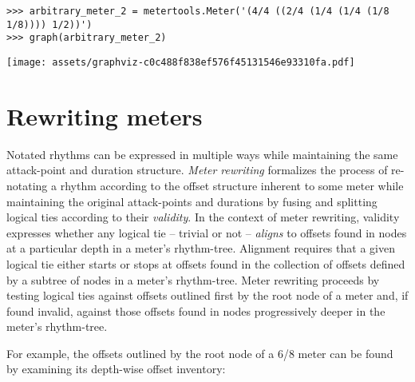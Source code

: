 \begin{comment}
<abjad>
arbitrary_meter_2 = metertools.Meter('(4/4 ((2/4 (1/4 (1/4 (1/8 1/8)))) 1/2))')
graph(arbitrary_meter_2)
</abjad>
\end{comment}

\begin{singlespacing}
\vspace{-0.5\baselineskip}
\begin{lstlisting}
>>> arbitrary_meter_2 = metertools.Meter('(4/4 ((2/4 (1/4 (1/4 (1/8 1/8)))) 1/2))')
>>> graph(arbitrary_meter_2)
\end{lstlisting}
\noindent\texttt{[image: assets/graphviz-c0c488f838ef576f45131546e93310fa.pdf]}
\end{singlespacing}

\section{Rewriting meters}
\label{sec:rewriting-meters}


Notated rhythms can be expressed in multiple ways while maintaining the same
attack-point and duration structure. \emph{Meter rewriting} formalizes the
process of re-notating a rhythm according to the offset structure inherent to
some meter while maintaining the original attack-points and durations by fusing
and splitting logical ties according to their \emph{validity}. In the context
of meter rewriting, validity expresses whether any logical tie -- trivial or
not -- \emph{aligns} to offsets found in nodes at a particular depth in a
meter's rhythm-tree. Alignment requires that a given logical tie either starts
or stops at offsets found in the collection of offsets defined by a subtree of
nodes in a meter's rhythm-tree. Meter rewriting proceeds by testing logical
ties against offsets outlined first by the root node of a meter and, if found
invalid, against those offsets found in nodes progressively deeper in the
meter's rhythm-tree.

For example, the offsets outlined by the root node of a 6/8 meter can be found
by examining its depth-wise offset inventory:

\begin{comment}
<abjad>
six_eight_meter = metertools.Meter((6, 8))
six_eight_meter.depthwise_offset_inventory[0]
</abjad>
\end{comment}

